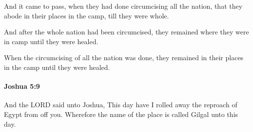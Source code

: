 			\begin{versebox}
					\item[BHS] 
					\item[ASV] And it came to pass, when they had done circumcising all the nation, that they abode in their places in the camp, till they were whole.
					\item[NIV] And after the whole nation had been circumcised, they remained where they were in camp until they were healed.
					\item[NRSV] When the circumcising of all the nation was done, they remained in their places in the camp until they were healed.
			\end{versebox}

		\paragraph{Joshua 5:9} %
			\label{JOSHUA-5-9}

			And the LORD said unto Joshua, This day have I rolled away the reproach of Egypt from off you. Wherefore the name of the place is called Gilgal unto this day.


